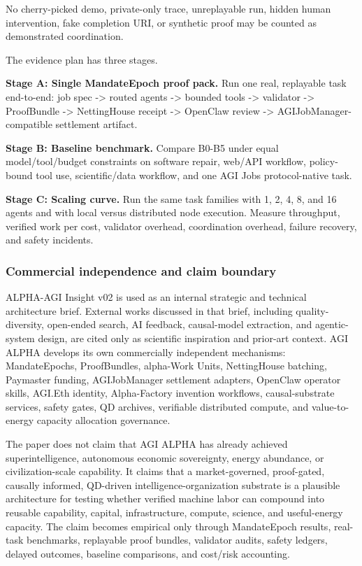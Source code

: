 No cherry-picked demo, private-only trace, unreplayable run, hidden
human intervention, fake completion URI, or synthetic proof may be
counted as demonstrated coordination.

The evidence plan has three stages.

\textbf{Stage A: Single MandateEpoch proof pack.} Run one real,
replayable task end-to-end: job spec -\textgreater{} routed agents
-\textgreater{} bounded tools -\textgreater{} validator -\textgreater{}
ProofBundle -\textgreater{} NettingHouse receipt -\textgreater{}
OpenClaw review -\textgreater{} AGIJobManager-compatible settlement
artifact.

\textbf{Stage B: Baseline benchmark.} Compare B0-B5 under equal
model/tool/budget constraints on software repair, web/API workflow,
policy-bound tool use, scientific/data workflow, and one AGI Jobs
protocol-native task.

\textbf{Stage C: Scaling curve.} Run the same task families with 1, 2,
4, 8, and 16 agents and with local versus distributed node execution.
Measure throughput, verified work per cost, validator overhead,
coordination overhead, failure recovery, and safety incidents.

\subsubsection{Commercial independence and claim
boundary}\label{commercial-independence-and-claim-boundary}

ALPHA-AGI Insight v02 is used as an internal strategic and technical
architecture brief. External works discussed in that brief, including
quality-diversity, open-ended search, AI feedback, causal-model
extraction, and agentic-system design, are cited only as scientific
inspiration and prior-art context. AGI ALPHA develops its own
commercially independent mechanisms: MandateEpochs, ProofBundles,
alpha-Work Units, NettingHouse batching, Paymaster funding,
AGIJobManager settlement adapters, OpenClaw operator skills, AGI.Eth
identity, Alpha-Factory invention workflows, causal-substrate services,
safety gates, QD archives, verifiable distributed compute, and
value-to-energy capacity allocation governance.

The paper does not claim that AGI ALPHA has already achieved
superintelligence, autonomous economic sovereignty, energy abundance, or
civilization-scale capability. It claims that a market-governed,
proof-gated, causally informed, QD-driven intelligence-organization
substrate is a plausible architecture for testing whether verified
machine labor can compound into reusable capability, capital,
infrastructure, compute, science, and useful-energy capacity. The claim
becomes empirical only through MandateEpoch results, real-task
benchmarks, replayable proof bundles, validator audits, safety ledgers,
delayed outcomes, baseline comparisons, and cost/risk accounting.

